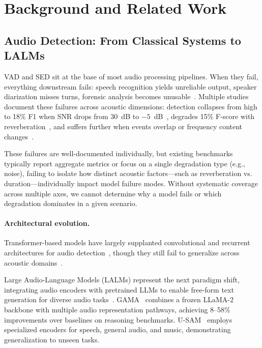 \documentclass[11pt,a4paper]{article}
\begin{document}
\section{Background and Related Work}
\label{sec:background}


\subsection{Audio Detection: From Classical Systems to LALMs}
\label{subsec:audio_detection_evolution}

VAD and SED sit at the base of most audio processing pipelines. When they fail, everything downstream fails: speech recognition yields unreliable output, speaker diarization misses turns, forensic analysis becomes unusable~\cite{mihalache2022using,turpault2021sound}. Multiple studies document these failures across acoustic dimensions: detection collapses from high to 18\% F1 when SNR drops from 30~dB to $-5$~dB~\cite{papadimitriou2020audio}, degrades 15\% F-score with reverberation~\cite{turpault2021sound,bibbo2025room}, and suffers further when events overlap or frequency content changes~\cite{de2021analysis,wang2025sincqdr}.

These failures are well-documented individually, but existing benchmarks typically report aggregate metrics or focus on a single degradation type (e.g., noise), failing to isolate how distinct acoustic factors—such as reverberation vs. duration—individually impact model failure modes. Without systematic coverage across multiple axes, we cannot determine why a model fails or which degradation dominates in a given scenario.

\paragraph{Architectural evolution.}
Transformer-based models have largely supplanted convolutional and recurrent architectures for audio detection~\cite{ZAMAN2025104956}, though they still fail to generalize across acoustic domains~\cite{de2021analysis,bibbo2025room}.

Large Audio-Language Models (LALMs) represent the next paradigm shift, integrating audio encoders with pretrained LLMs to enable free-form text generation for diverse audio tasks~\cite{ghosh2024gama,wang2025u,chu2024qwen2}. GAMA~\cite{ghosh2024gama} combines a frozen LLaMA-2 backbone with multiple audio representation pathways, achieving 8--58\% improvements over baselines on reasoning benchmarks. U-SAM~\cite{wang2025u} employs specialized encoders for speech, general audio, and music, demonstrating generalization to unseen tasks.
\end{document}
